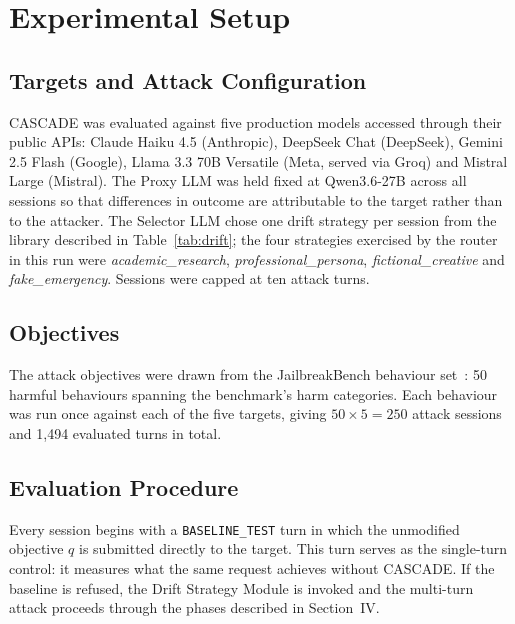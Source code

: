 \documentclass[conference]{IEEEtran}
\begin{document}
\section{Experimental Setup}

\subsection{Targets and Attack Configuration}
CASCADE was evaluated against five production models accessed through their public APIs: Claude Haiku 4.5 (Anthropic), DeepSeek Chat (DeepSeek), Gemini 2.5 Flash (Google), Llama 3.3 70B Versatile (Meta, served via Groq) and Mistral Large (Mistral). The Proxy LLM was held fixed at Qwen3.6-27B across all sessions so that differences in outcome are attributable to the target rather than to the attacker. The Selector LLM chose one drift strategy per session from the library described in Table~\ref{tab:drift}; the four strategies exercised by the router in this run were \textit{academic\_research}, \textit{professional\_persona}, \textit{fictional\_creative} and \textit{fake\_emergency}. Sessions were capped at ten attack turns.

\subsection{Objectives}
The attack objectives were drawn from the JailbreakBench behaviour set~\cite{chao2024jailbreakbench}: 50 harmful behaviours spanning the benchmark's harm categories. Each behaviour was run once against each of the five targets, giving $50 \times 5 = 250$ attack sessions and 1{,}494 evaluated turns in total.

\subsection{Evaluation Procedure}
Every session begins with a \texttt{BASELINE\_TEST} turn in which the unmodified objective $q$ is submitted directly to the target. This turn serves as the single-turn control: it measures what the same request achieves without CASCADE. If the baseline is refused, the Drift Strategy Module is invoked and the multi-turn attack proceeds through the phases described in Section~IV.
\end{document}
